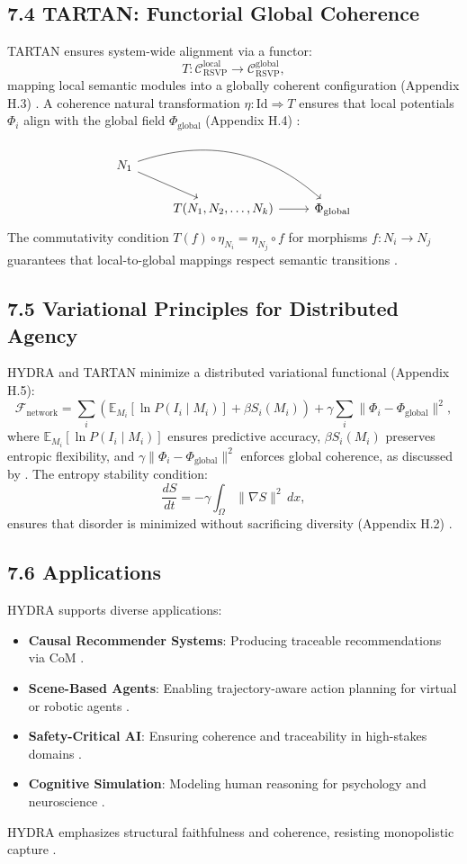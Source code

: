\documentclass[12pt]{article}
\begin{document}
\subsection*{7.4 TARTAN: Functorial Global Coherence}
TARTAN ensures system-wide alignment via a functor:
\[
T: \mathcal{C}_{\text{RSVP}}^{\text{local}} \to \mathcal{C}_{\text{RSVP}}^{\text{global}},
\]
mapping local semantic modules into a globally coherent configuration (Appendix H.3) \citep{maclane1998}. A coherence natural transformation \(\eta: \text{Id} \Rightarrow T\) ensures that local potentials \(\Phi_i\) align with the global field \(\Phi_{\text{global}}\) (Appendix H.4) \citep{lawvere2009}:
\[
\begin{tikzcd}
N_1 \arrow[dr] \arrow[drr, bend left] & & \\
& T(N_1, N_2, \dots, N_k) \arrow[r] & \Phi_{\text{global}}
\end{tikzcd}
\]
The commutativity condition \(T(f) \circ \eta_{N_i} = \eta_{N_j} \circ f\) for morphisms \(f: N_i \to N_j\) guarantees that local-to-global mappings respect semantic transitions \citep{may1999}.

\subsection*{7.5 Variational Principles for Distributed Agency}
HYDRA and TARTAN minimize a distributed variational functional (Appendix H.5):
\[
\mathcal{F}_{\text{network}} = \sum_i \left( \mathbb{E}_{M_i}[\ln P(I_i \mid M_i)] + \beta S_i(M_i) \right) + \gamma \sum_i \|\Phi_i - \Phi_{\text{global}}\|^2,
\]
where \(\mathbb{E}_{M_i}[\ln P(I_i \mid M_i)]\) ensures predictive accuracy, \(\beta S_i(M_i)\) preserves entropic flexibility, and \(\gamma \|\Phi_i - \Phi_{\text{global}}\|^2\) enforces global coherence, as discussed by \citet{friston2010}. The entropy stability condition:
\[
\frac{dS}{dt} = -\gamma \int_{\Omega} \|\nabla S\|^2 \, dx,
\]
ensures that disorder is minimized without sacrificing diversity (Appendix H.2) \citep{shannon1948}.

\subsection*{7.6 Applications}
HYDRA supports diverse applications:
\begin{itemize}
    \item \textbf{Causal Recommender Systems}: Producing traceable recommendations via CoM \citep{pearl2009}.
    \item \textbf{Scene-Based Agents}: Enabling trajectory-aware action planning for virtual or robotic agents \citep{hohwy2013}.
    \item \textbf{Safety-Critical AI}: Ensuring coherence and traceability in high-stakes domains \citep{friston2010}.
    \item \textbf{Cognitive Simulation}: Modeling human reasoning for psychology and neuroscience \citep{tononi2004}.
\end{itemize}
HYDRA emphasizes structural faithfulness and coherence, resisting monopolistic capture \citep{zuboff2019}.
\end{document}
